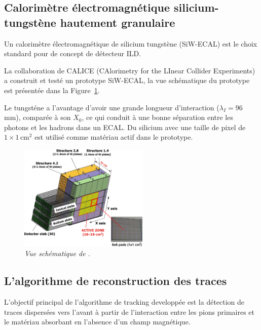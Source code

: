 \subsection*{Calorim\`etre \'electromagn\'etique silicium-tungst\`ene hautement granulaire}

Un calorim\`etre \'electromagn\'etique de silicium tungst\`ene (SiW-ECAL) est le
choix standard pour de concept de d\'etecteur ILD.

La collaboration de CALICE (CAlorimetry for the LInear Collider Experiments) a construit et testé un prototype SiW-ECAL, la vue schématique du prototype est présentée dans la Figure~\ref {fig:ECAL-schemeF}.

Le tungst\'ene a l’avantage d’avoir une grande longueur d’interaction ($\lambda_I = 96$\,mm), compar\'ee \`a son $X_0$, ce
qui conduit \`a une bonne s\'eparation entre les photons et les hadrons dans un ECAL. 
Du silicium avec une taille de pixel de $1\times1$\,cm$^2$ est utilis\'e comme mat\'eriau actif dans le prototype. 
\begin{figure}
	\centering
	\includegraphics[width=0.55\textwidth]{ECAL/graphics/ecal-new.png}
	\caption{\label{fig:ECAL-schemeF} \sl  Vue sch\'ematique de \ecal.}
\end{figure}

\newpage
\subsection*{L'algorithme de reconstruction des traces}
L'objectif principal de l'algorithme de tracking developp\'ee est la détection de traces dispersées vers l'avant à partir de l'interaction entre les pions primaires et le matériau absorbant en l'absence d'un champ magnétique.

